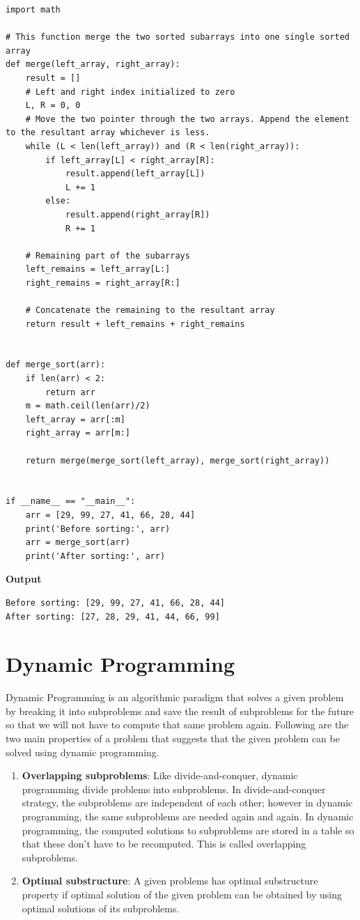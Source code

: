 \documentclass[a4paper,11pt]{book}
\begin{document}
\begin{lstlisting}
import math

# This function merge the two sorted subarrays into one single sorted array
def merge(left_array, right_array):
    result = []
    # Left and right index initialized to zero
    L, R = 0, 0
    # Move the two pointer through the two arrays. Append the element to the resultant array whichever is less.
    while (L < len(left_array)) and (R < len(right_array)):
        if left_array[L] < right_array[R]:
            result.append(left_array[L])
            L += 1
        else:
            result.append(right_array[R])
            R += 1
            
    # Remaining part of the subarrays
    left_remains = left_array[L:]
    right_remains = right_array[R:]

    # Concatenate the remaining to the resultant array
    return result + left_remains + right_remains


def merge_sort(arr):
    if len(arr) < 2:
        return arr
    m = math.ceil(len(arr)/2)
    left_array = arr[:m]
    right_array = arr[m:]

    return merge(merge_sort(left_array), merge_sort(right_array))


if __name__ == "__main__":
    arr = [29, 99, 27, 41, 66, 28, 44]
    print('Before sorting:', arr)
    arr = merge_sort(arr)
    print('After sorting:', arr)
\end{lstlisting}
\textbf{Output}
\begin{lstlisting}
Before sorting: [29, 99, 27, 41, 66, 28, 44]
After sorting: [27, 28, 29, 41, 44, 66, 99]
\end{lstlisting}

\newpage

\chapter{Dynamic Programming}

\noindent Dynamic Programming is an algorithmic paradigm that solves a given problem by breaking it into subproblems and save the result  of subproblems for the future so that we will not have to compute that same problem again. Following are the two main properties of a problem that suggests that the given problem can be solved using dynamic programming.

\begin{enumerate}
    \item \textbf{Overlapping subproblems}: Like divide-and-conquer, dynamic programming divide problems into subproblems. In divide-and-conquer strategy, the subproblems are independent of each other; however in dynamic programming, the same subproblems are needed again and again. In dynamic programming, the computed solutions to subproblems are stored in a table so that these don't have to be recomputed. This is called overlapping subproblems.
    \item \textbf{Optimal substructure}: A given problems has optimal substructure property if optimal solution of the given problem can be obtained by using optimal solutions of its subproblems.
\end{enumerate}
\end{document}
